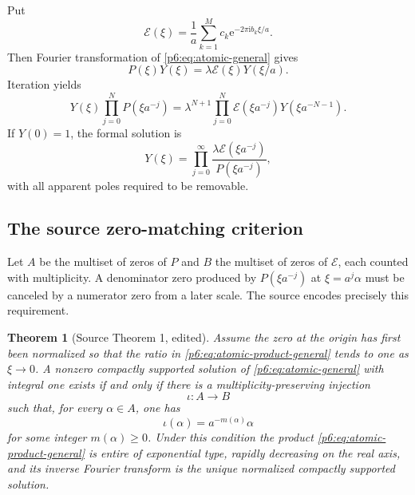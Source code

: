 \documentclass[11pt,oneside]{article}
\numberwithin{equation}{section}
\newtheorem{theorem}{Theorem}[section]
\theoremstyle{definition}
\theoremstyle{remark}
\newcommand{\e}{\mathrm e}
\newcommand{\ii}{\mathrm i}
\begin{document}
Put
\begin{equation}\label{p6:eq:E-symbol}
 \mathcal E(\xi)=\frac1a\sum_{k=1}^{M}c_k
 \e^{-2\pi\ii b_k\xi/a}.
\end{equation}
Then Fourier transformation of \eqref{p6:eq:atomic-general} gives
\begin{equation}\label{p6:eq:fourier-atomic}
 P(\xi)Y(\xi)=\lambda\mathcal E(\xi)Y(\xi/a).
\end{equation}
Iteration yields
\begin{equation}\label{p6:eq:fourier-atomic-iterated}
 Y(\xi)\prod_{j=0}^{N}P(\xi a^{-j})
 =\lambda^{N+1}\prod_{j=0}^{N}\mathcal E(\xi a^{-j})
 Y(\xi a^{-N-1}).
\end{equation}
If $Y(0)=1$, the formal solution is
\begin{equation}\label{p6:eq:atomic-product-general}
 Y(\xi)=\prod_{j=0}^{\infty}
 \frac{\lambda\mathcal E(\xi a^{-j})}{P(\xi a^{-j})},
\end{equation}
with all apparent poles required to be removable.

\subsection{The source zero-matching criterion}

Let $A$ be the multiset of zeros of $P$ and $B$ the multiset of zeros of
$\mathcal E$, each counted with multiplicity.  A denominator zero produced by
$P(\xi a^{-j})$ at $\xi=a^j\alpha$ must be canceled by a numerator zero from a
later scale.  The source encodes precisely this requirement.

\begin{theorem}[Source Theorem 1, edited]\label{p6:thm:source-zero-matching}
Assume the zero at the origin has first been normalized so that the ratio in
\eqref{p6:eq:atomic-product-general} tends to one as $\xi\to0$.  A nonzero compactly
supported solution of \eqref{p6:eq:atomic-general} with integral one exists if and
only if there is a multiplicity-preserving injection
\[
 \iota:A\longrightarrow B
\]
such that, for every $\alpha\in A$, one has
\[
 \iota(\alpha)=a^{-m(\alpha)}\alpha
\]
for some integer $m(\alpha)\ge0$.  Under this condition the product
\eqref{p6:eq:atomic-product-general} is entire of exponential type, rapidly
decreasing on the real axis, and its inverse Fourier transform is the unique
normalized compactly supported solution.
\end{theorem}
\end{document}

